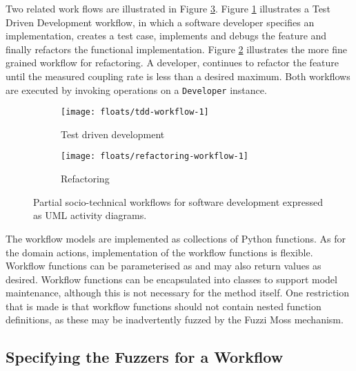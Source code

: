 \documentclass{sig-alternate}
\begin{document}
Two related work flows are illustrated in Figure \ref{fig:workflow-partial}.
Figure \ref{fig:workflow-tdd} illustrates a Test Driven Development workflow, in
which a software developer specifies an implementation, creates a test case,
implements and debugs the feature and finally refactors the functional
implementation.  Figure \ref{fig:workflow-refactoring} illustrates the more fine
grained workflow for refactoring.  A developer, continues to refactor the
feature until the measured coupling rate is less than a desired maximum.  Both
workflows are executed by invoking operations on a \lstinline!Developer!
instance.

\begin{figure}
  \centering

  \begin{subfigure}{\linewidth}
    \centering
    \texttt{[image: floats/tdd-workflow-1]}

    \caption{Test driven development}
    \label{fig:workflow-tdd}
  \end{subfigure}

  \begin{subfigure}{\linewidth}
    \centering
    \texttt{[image: floats/refactoring-workflow-1]}
    
    \caption{Refactoring}
    \label{fig:workflow-refactoring}
  \end{subfigure}
  
  \caption{Partial socio-technical workflows for software development expressed
    as UML activity diagrams.}

  \label{fig:workflow-partial}
\end{figure}


The workflow models are implemented as collections of Python functions.  As for
the domain actions, implementation of the workflow functions is
flexible. Workflow functions can be parameterised as and may also return values
as desired.  Workflow functions can be encapsulated into classes to support
model maintenance, although this is not necessary for the method itself.  One
restriction that is made is that workflow functions should not contain nested
function definitions, as these may be inadvertently fuzzed by the Fuzzi Moss
mechanism.


\subsection{Specifying the Fuzzers for a Workflow}
\end{document}
